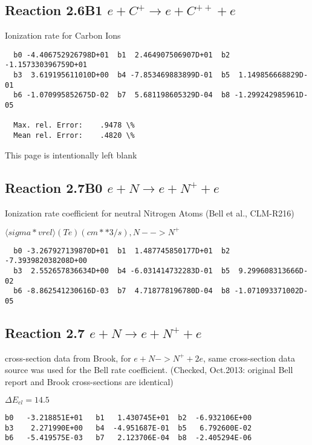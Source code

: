 \documentclass[12pt,dvipdfmx]{article}
\begin{document}
\subsection{
Reaction 2.6B1   $e + C^+ \rightarrow e + C^{++} + e  $
}

  Ionization rate for Carbon Ions


\begin{small}\begin{verbatim}
  b0 -4.406752926798D+01  b1  2.464907506907D+01  b2 -1.157330396759D+01
  b3  3.619195611010D+00  b4 -7.853469883899D-01  b5  1.149856668829D-01
  b6 -1.070995852675D-02  b7  5.681198605329D-04  b8 -1.299242985961D-05

  Max. rel. Error:    .9478 \%
  Mean rel. Error:    .4820 \%

\end{verbatim}\end{small}
\newpage
This page is intentionally left blank
\newpage



\subsection{
Reaction 2.7B0   $e + N \rightarrow e + N^+ + e  $
}

  Ionization rate coefficient for neutral Nitrogen Atoms
  (Bell et al., CLM-R216) \cite{kn:Bell}

  $ \langle sigma*vrel \rangle(Te)  (cm**3/s), N --> N^+$

\begin{small}\begin{verbatim}
  b0 -3.267927139870D+01  b1  1.487745850177D+01  b2 -7.393982038208D+00
  b3  2.552657836634D+00  b4 -6.031414732283D-01  b5  9.299608313666D-02
  b6 -8.862541230616D-03  b7  4.718778196780D-04  b8 -1.071093371002D-05

\end{verbatim}\end{small}

\subsection{
Reaction 2.7    $e + N \rightarrow e + N^+ + e  $
}
cross-section data from Brook, \cite{kn:Brook}   for $ e + N -> N^+ + 2e $,
same cross-section data source was used for the Bell rate coefficient.
(Checked, Oct.2013: original Bell report and Brook cross-sections
are identical)

$\Delta E_{el} = 14.5$
\begin{small}\begin{verbatim}
b0   -3.218851E+01   b1   1.430745E+01  b2  -6.932106E+00
b3    2.271990E+00   b4  -4.951687E-01  b5   6.792600E-02
b6   -5.419575E-03   b7   2.123706E-04  b8  -2.405294E-06
\end{verbatim}\end{small}
\end{document}
